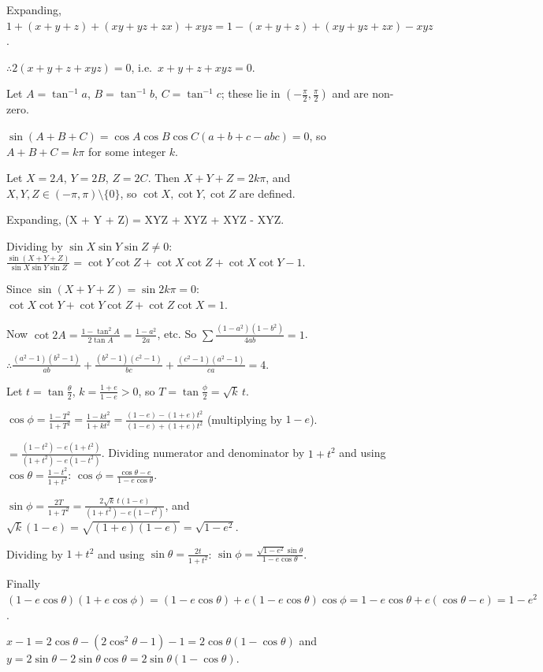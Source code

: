   Expanding, $1 + (x + y + z) + (xy + yz + zx) + xyz = 1 - (x + y + z) + (xy + yz + zx) - xyz$.

  $\therefore 2(x + y + z + xyz) = 0$, i.e.\ $x + y + z + xyz = 0$.
\item Let $A = \tan^{-1}a$, $B = \tan^{-1}b$, $C = \tan^{-1}c$; these lie in $\left(-\frac{\pi}{2},
  \frac{\pi}{2}\right)$ and are non-zero.

  $\sin(A + B + C) = \cos A\cos B\cos C(a + b + c - abc) = 0$, so $A + B + C = k\pi$ for some integer $k$.

  Let $X = 2A$, $Y = 2B$, $Z = 2C$. Then $X + Y + Z = 2k\pi$, and $X, Y, Z\in(-\pi, \pi)\setminus\{0\}$, so $\cot X,
  \cot Y, \cot Z$ are defined.

  Expanding,
  \startformula
    \sin(X + Y + Z) = \sin X\cos Y\cos Z + \cos X\sin Y\cos Z + \cos X\cos Y\sin Z - \sin X\sin Y\sin Z.
  \stopformula

  Dividing by $\sin X\sin Y\sin Z\neq 0$: $\frac{\sin(X + Y + Z)}{\sin X\sin Y\sin Z} = \cot Y\cot Z + \cot X\cot Z
  + \cot X\cot Y - 1$.

  Since $\sin(X + Y + Z) = \sin2k\pi = 0$: $\cot X\cot Y + \cot Y\cot Z + \cot Z\cot X = 1$.

  Now $\cot2A = \frac{1 - \tan^2A}{2\tan A} = \frac{1 - a^2}{2a}$, etc. So $\displaystyle\sum\frac{(1 - a^2)(1 -
    b^2)}{4ab} = 1$.

  $\therefore \frac{(a^2 - 1)(b^2 - 1)}{ab} + \frac{(b^2 - 1)(c^2 - 1)}{bc} + \frac{(c^2 - 1)(a^2 - 1)}{ca} = 4$.
\item Let $t = \tan\frac{\theta}{2}$, $k = \frac{1 + e}{1 - e} > 0$, so $T = \tan\frac{\phi}{2} = \sqrt{k}\,t$.

  $\cos\phi = \frac{1 - T^2}{1 + T^2} = \frac{1 - kt^2}{1 + kt^2} = \frac{(1 - e) - (1 + e)t^2}{(1 - e) + (1 +
    e)t^2}$ (multiplying by $1 - e$).

  $= \frac{(1 - t^2) - e(1 + t^2)}{(1 + t^2) - e(1 - t^2)}$. Dividing numerator and denominator by $1 + t^2$ and
  using $\cos\theta = \frac{1 - t^2}{1 + t^2}$: $\cos\phi = \frac{\cos\theta - e}{1 - e\cos\theta}$.

  $\sin\phi = \frac{2T}{1 + T^2} = \frac{2\sqrt{k}\,t(1 - e)}{(1 + t^2) - e(1 - t^2)}$, and $\sqrt{k}(1 - e)
  = \sqrt{(1 + e)(1 - e)} = \sqrt{1 - e^2}$.

  Dividing by $1 + t^2$ and using $\sin\theta = \frac{2t}{1 + t^2}$: $\sin\phi = \frac{\sqrt{1 - e^2}\sin\theta}{1 -
    e\cos\theta}$.

  Finally $(1 - e\cos\theta)(1 + e\cos\phi) = (1 - e\cos\theta) + e(1 - e\cos\theta)\cos\phi = 1 - e\cos\theta +
  e(\cos\theta - e) = 1 - e^2$.
\item $x - 1 = 2\cos\theta - (2\cos^2\theta - 1) - 1 = 2\cos\theta(1 - \cos\theta)$ and $y = 2\sin\theta -
  2\sin\theta\cos\theta = 2\sin\theta(1 - \cos\theta)$.

